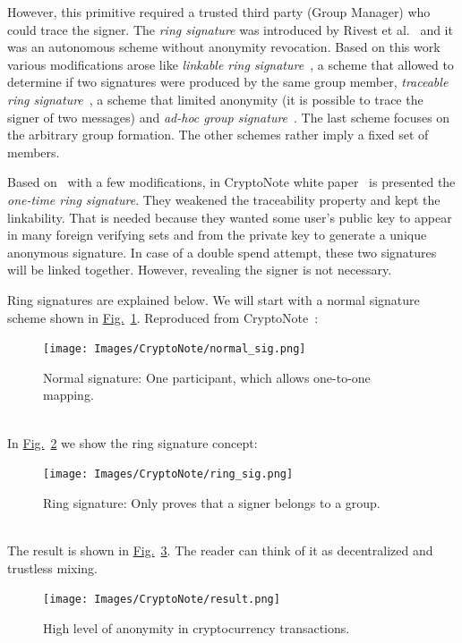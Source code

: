 However, this primitive required a trusted third party (Group Manager) who could trace the signer. The \emph{ring signature} was introduced by Rivest et al.~\cite{ring} and it was an autonomous scheme without anonymity revocation. Based on this work various modifications arose like \emph{linkable ring signature}~\cite{link1,link2,short}, a scheme that allowed to determine if two signatures were produced by the same group member, \emph{traceable ring signature}~\cite{traceable1,traceable2}, a scheme that limited anonymity (it is possible to trace the signer of two messages) and \emph{ad-hoc group signature}~\cite{ad-hoc1,ad-hoc2}. The last scheme focuses on the arbitrary group formation. The other schemes rather imply a fixed set of members.

Based on~\cite{traceable2} with a few modifications, in CryptoNote white paper~\cite{citeulike:14139412} is presented the \emph{one-time ring signature}. They weakened the traceability property and kept the linkability. That is needed because they wanted some user's public key to appear in many foreign verifying sets and from the private key to generate a unique anonymous signature. In case of a double spend attempt, these two signatures will be linked together. However, revealing the signer is not necessary.

Ring signatures are explained below. We will start with a normal signature scheme shown in \hyperref[fig:normal_sig]{Fig.}~\ref{fig:normal_sig}. Reproduced from CryptoNote~\cite{cryptonote}:\\
\begin{figure}[ht]
  \centering
  \texttt{[image: Images/CryptoNote/normal\_sig.png]}
  \caption{Normal signature: One participant, which allows one-to-one mapping.}
  \label{fig:normal_sig}
\end{figure}\\
In \hyperref[fig:ring_sig]{Fig.}~\ref{fig:ring_sig} we show the ring signature concept:\\
\begin{figure}[ht]
  \centering
  \texttt{[image: Images/CryptoNote/ring\_sig.png]}
  \caption{Ring signature: Only proves that a signer belongs to a group.}
  \label{fig:ring_sig}
\end{figure}\\
The result is shown in \hyperref[fig:result]{Fig.}~\ref{fig:result}. The reader can think of it as decentralized and trustless mixing.
\begin{figure}[ht]
  \centering
  \texttt{[image: Images/CryptoNote/result.png]}
  \caption{High level of anonymity in cryptocurrency transactions.}
  \label{fig:result}
\end{figure}

